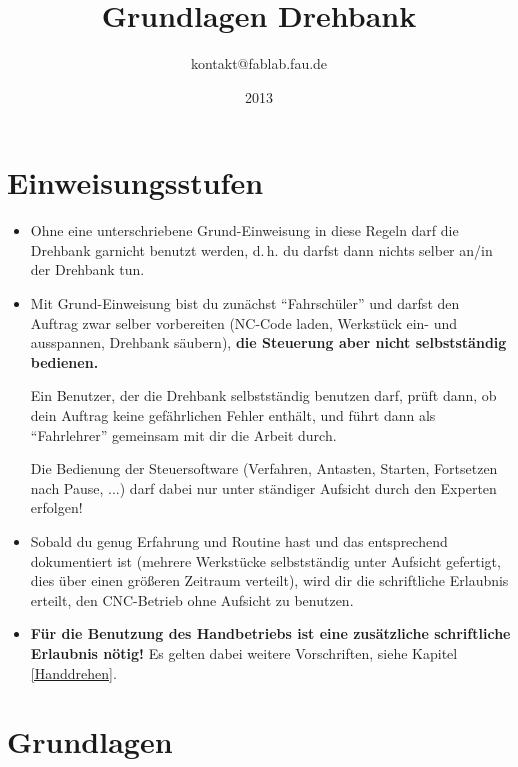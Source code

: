 \documentclass{\basedir/fablab-document}
\date{2013}
\author{kontakt@fablab.fau.de}
\title{Grundlagen Drehbank}
\begin{document}
\tableofcontents

\newpage

\section{Einweisungsstufen}

\begin{itemize}
 \item Ohne eine unterschriebene Grund-Einweisung in diese Regeln darf die Drehbank garnicht benutzt werden, d.\,h. du darfst dann nichts selber an/in der Drehbank tun.
 \item Mit Grund-Einweisung bist du zunächst \enquote{Fahrschüler} und darfst den Auftrag zwar selber vorbereiten (NC-Code laden, Werkstück ein- und ausspannen, Drehbank säubern), \textbf{die Steuerung aber nicht selbstständig bedienen.} 

       Ein Benutzer, der die Drehbank selbstständig benutzen darf, prüft dann, ob dein Auftrag keine gefährlichen Fehler enthält, und führt dann als \enquote{Fahrlehrer} gemeinsam mit dir die Arbeit durch.

 Die Bedienung der Steuersoftware (Verfahren, Antasten, Starten, Fortsetzen nach Pause, ...) darf dabei nur unter ständiger Aufsicht durch den Experten erfolgen!
 \item Sobald du genug Erfahrung und Routine hast und das entsprechend dokumentiert ist (mehrere Werkstücke selbstständig unter Aufsicht gefertigt, dies über einen größeren Zeitraum verteilt), wird dir die schriftliche Erlaubnis erteilt, den CNC-Betrieb ohne Aufsicht zu benutzen.
 \item  \textbf{Für die Benutzung des Handbetriebs ist eine zusätzliche schriftliche Erlaubnis nötig!} Es gelten dabei weitere Vorschriften, siehe Kapitel \ref{Handdrehen}.
\end{itemize}


\newpage
\section{Grundlagen}
\end{document}
